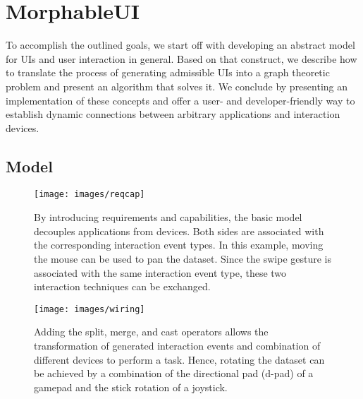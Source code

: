 \documentclass[twoside,twocolumn,10pt]{article}
\begin{document}
%
%
\section{MorphableUI}


%
%
To accomplish the outlined goals, we start off with developing an abstract model for UIs and user interaction in general. Based on that construct, we describe how to translate the process of generating admissible UIs into a graph theoretic problem and present an algorithm that solves it. We conclude by presenting an implementation of these concepts and offer a user- and developer-friendly way to establish dynamic connections between arbitrary applications and interaction devices.


\subsection{Model} \label{model}

\begin{figure}[!h]
\centering
\texttt{[image: images/reqcap]}
\vskip-1mm
\caption{By introducing requirements and capabilities, the basic model decouples applications from devices. Both sides are associated with the corresponding interaction event types. In this example, moving the mouse can be used to pan the dataset. Since the swipe gesture is associated with the same interaction event type, these two interaction techniques can be exchanged.}
\label{fig:reqcap}
\end{figure}


\begin{figure}[!h]
\centering
\texttt{[image: images/wiring]}
\vskip-1mm
\caption{Adding the split, merge, and cast operators allows the transformation of generated interaction events and combination of different devices to perform a task. Hence, rotating the dataset can be achieved by a combination of the directional pad (d-pad) of a gamepad and the stick rotation of a joystick.}
\label{fig:wiring}
\end{figure}



\end{document}

